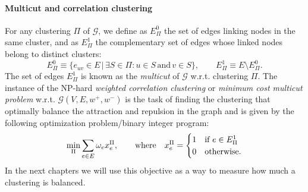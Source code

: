 \paragraph{Multicut and correlation clustering} For any clustering $\Pi$ of $\mathcal{G}$, we define as $E^0_\Pi$ the set of edges linking nodes in the same cluster, and as $E_\Pi^1$ the complementary set of edges whose linked nodes belong to distinct clusters:
\begin{equation}
E_\Pi^0 \equiv \{ e_{uv} \in E \,|\, \exists S \in \Pi : u \in S \, \text{and} \, v \in S \}, \qquad E^1_\Pi \equiv E \setminus E^0_\Pi.
\end{equation}
The set of edges $E_\Pi^1$ is known as the \emph{multicut} of $\mathcal{G}$ w.r.t. clustering $\Pi$. The instance of the NP-hard \emph{weighted correlation clustering} or \emph{minimum cost multicut problem} w.r.t. $\mathcal{G}(V,E,w^+, w^-)$ \cite{kappes2011globally,chopra1991multiway,andres2015lifting} is the task of finding the clustering that optimally balance the attraction and repulsion in the graph and is given by the following optimization problem/binary integer program:
\begin{equation}
 \min_\Pi \sum_{e\in E} \omega_e x_e^\Pi,  \qquad \text{where} \quad x^\Pi_e = 
 \begin{cases} 
 1 & \text{if } e\in E^1_\Pi \\
 0 & \text{otherwise}.
 \end{cases}
\end{equation}
In the next chapters we will use this objective as a way to measure how much a clustering is balanced.

